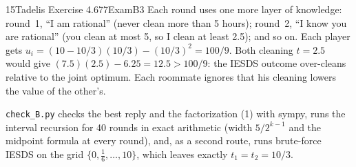 \begin{exsol}{15}{Tadelis Exercise 4.6}{77}{Exam}{B3}
\interp Each round uses one more layer of knowledge: round~1, ``I am rational'' (never clean more
than 5 hours); round~2, ``I know you are rational'' (you clean at most 5, so I clean at least
2.5); and so on. Each player gets $u_i = (10 - 10/3)(10/3) - (10/3)^2 = 100/9$. Both cleaning
$t = 2.5$ would give $(7.5)(2.5) - 6.25 = 12.5 > 100/9$: the IESDS outcome over-cleans relative to
the joint optimum. Each roommate ignores that his cleaning lowers the value of the other's.

\verify \texttt{check\_B.py} checks the best reply and the factorization (1) with sympy, runs the
interval recursion for 40 rounds in exact arithmetic (width $5/2^{k-1}$ and the midpoint formula
at every round), and, as a second route, runs brute-force IESDS on the grid
$\{0, \tfrac16, \dots, 10\}$, which leaves exactly $t_1 = t_2 = 10/3$.

\end{exsol}
